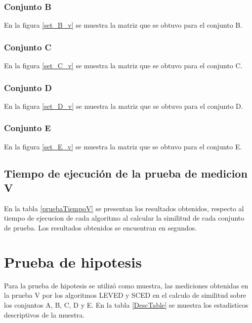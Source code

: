 \subsubsection{Conjunto B}
En la figura \ref{set_B_v} se muestra la matriz que se obtuvo para el conjunto B.


\subsubsection{Conjunto C}
En la figura \ref{set_C_v} se muestra la matriz que se obtuvo para el conjunto C.


\subsubsection{Conjunto D}
En la figura \ref{set_D_v} se muestra la matriz que se obtuvo para el conjunto D.


\subsubsection{Conjunto E}
En la figura \ref{set_E_v} se muestra la matriz que se obtuvo para el conjunto E.


\subsection{Tiempo de ejecución de la prueba de medicion V}
En la tabla \ref{pruebaTiempoV} se presentan los resultados obtenidos, respecto al tiempo de ejecucion de cada algoritmo al calcular la similitud de cada conjunto de prueba. Los resultados obtenidos se encuentran en segundos.



\section{Prueba de hipotesis}
Para la prueba de hipotesis se utilizó como muestra, las mediciones obtenidas en la prueba V por los algoritmos LEVED y SCED en el calculo de similitud sobre los conjuntos A, B, C, D y E. En la tabla \ref{DescTable} se muestra los estadisticos descriptivos de la muestra.



